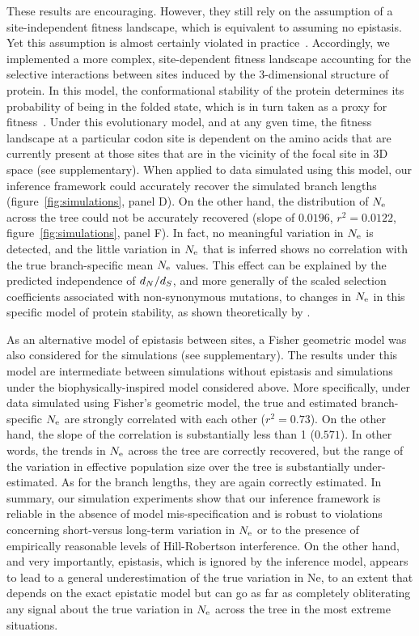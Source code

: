 \documentclass{article}
\begin{document}
These results are encouraging.
However, they still rely on the assumption of a site-independent fitness landscape, which is equivalent to assuming no epistasis.
Yet this assumption is almost certainly violated in practice~\citep{Pollock2014,Shah2015}.
Accordingly, we implemented a more complex, site-dependent fitness landscape accounting for the selective interactions between sites induced by the 3-dimensional structure of protein.
In this model, the conformational stability of the protein determines its probability of being in the folded state, which is in turn taken as a proxy for fitness~\citep{Williams2006, Goldstein2011, Pollock2012}.
Under this evolutionary model, and at any gven time, the fitness landscape at a particular {codon} site is dependent on the amino acids that are currently present at those sites that are in the vicinity of the focal site in 3D space (see supplementary).
When applied to data simulated using this model, our inference framework could accurately recover the simulated branch lengths (figure~\ref{fig:simulations}, panel D).
On the other hand, the distribution of $N_{\text{e}}$ across the tree could not be accurately recovered (slope of $0.0196$, $r^2 = 0.0122$, figure~\ref{fig:simulations}, panel F).
In fact, no meaningful variation in $N_{\text{e}}$ is detected, and the little variation in $N_{\text{e}}$ that is inferred shows no correlation with the true branch-specific mean $N_{\text{e}}$ values.
This effect can be explained by the predicted independence of $d_N / d_S$, and more generally of the scaled selection coefficients associated with {non-synonymous} mutations, to changes in $N_{\text{e}}$ in this specific model of protein stability, as shown theoretically by \citet{Goldstein2013}.

As an alternative model of epistasis between sites, a Fisher geometric model was also considered for the simulations (see supplementary).
The results under this model are intermediate between simulations without epistasis and simulations under the biophysically-inspired model considered above.
More specifically, under data simulated using Fisher’s geometric model, the true and estimated branch-specific $N_{\text{e}}$ are strongly correlated with each other ($r^2 = 0.73$).
On the other hand, the slope of the correlation is substantially less than 1 ($0.571$).
In other words, the trends in $N_{\text{e}}$ across the tree are correctly recovered, but the range of the variation in {effective population size} over the tree is substantially under-estimated.
As for the branch lengths, they are again correctly estimated.
In summary, our simulation experiments show that our inference framework is reliable in the absence of model mis-specification and is robust to violations concerning short-versus long-term variation in $N_{\text{e}}$ or to the presence of empirically reasonable levels of Hill-Robertson interference.
On the other hand, and very importantly, epistasis, which is ignored by the inference model, appears to lead to a general underestimation of the true variation in Ne, to an extent that depends on the exact epistatic model but can go as far as completely obliterating any signal about the true variation in $N_{\text{e}}$ across the tree in the most extreme situations.
\end{document}
